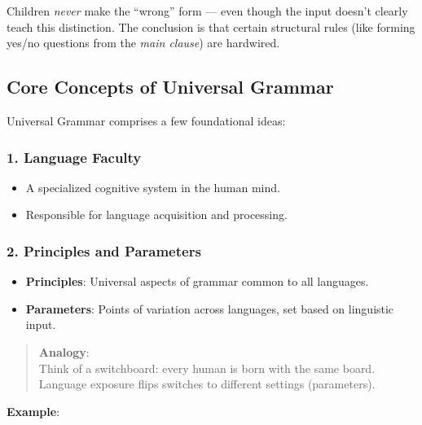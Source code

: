 \documentclass[12pt]{article}
\newcommand{\tightlist}{\itemsep 0pt\parskip 0pt\parsep 0pt}
\begin{document}
Children \emph{never} make the ``wrong'' form --- even though the input
doesn't clearly teach this distinction. The conclusion is that certain
structural rules (like forming yes/no questions from the \emph{main
clause}) are hardwired.

\hypertarget{core-concepts-of-universal-grammar}{%
\subsection{Core Concepts of Universal
Grammar}\label{core-concepts-of-universal-grammar}}

Universal Grammar comprises a few foundational ideas:

\hypertarget{language-faculty}{%
\subsubsection{\texorpdfstring{1. \textbf{Language
Faculty}}{1. Language Faculty}}\label{language-faculty}}

\begin{itemize}
\tightlist
\item
  A specialized cognitive system in the human mind.
\item
  Responsible for language acquisition and processing.
\end{itemize}

\hypertarget{principles-and-parameters}{%
\subsubsection{\texorpdfstring{2. \textbf{Principles and
Parameters}}{2. Principles and Parameters}}\label{principles-and-parameters}}

\begin{itemize}
\tightlist
\item
  \textbf{Principles}: Universal aspects of grammar common to all
  languages.
\item
  \textbf{Parameters}: Points of variation across languages, set based
  on linguistic input.
\end{itemize}

\begin{quote}
\textbf{Analogy}:\\
Think of a switchboard: every human is born with the same board.
Language exposure flips switches to different settings (parameters).
\end{quote}

\textbf{Example}:
\end{document}
